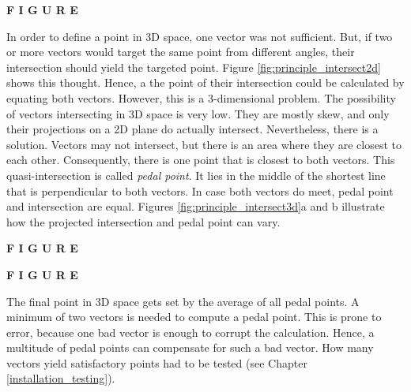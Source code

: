 \textbf{F I G U R E}

In order to define a point in \ac{3D} space, one vector was not sufficient. But, if two or more vectors would target the same point from different angles, their intersection should yield the targeted point. Figure \ref{fig:principle_intersect2d} shows this thought. Hence, a the point of their intersection could be calculated by equating both vectors. However, this is a 3-dimensional problem. The possibility of vectors intersecting in \ac{3D} space is very low. They are mostly skew, and only their projections on a \ac{2D} plane do actually intersect. Nevertheless, there is a solution. Vectors may not intersect, but there is an area where they are closest to each other. Consequently, there is one point that is closest to both vectors. This quasi-intersection is called \textit{pedal point}. It lies in the middle of the shortest line that is perpendicular to both vectors. In case both vectors do meet, pedal point and intersection are equal. Figures \ref{fig:principle_intersect3d}a and b illustrate how the projected intersection and pedal point can vary.

\textbf{F I G U R E}

\textbf{F I G U R E}

The final point in \ac{3D} space gets set by the average of all pedal points. A minimum of two vectors is needed to compute a pedal point. This is prone to error, because one bad vector is enough to corrupt the calculation. Hence, a multitude of pedal points can compensate for such a bad vector. How many vectors yield satisfactory points had to be tested (see Chapter \ref{installation_testing}).

